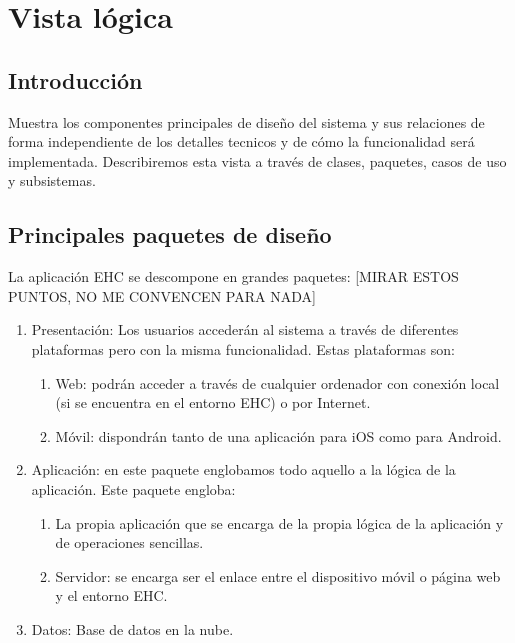 \chapter{Vista l\'ogica}
\section{Introducci\'on}
Muestra los componentes principales de dise\~no del sistema y sus relaciones de forma independiente de los detalles tecnicos y de c\'omo la funcionalidad ser\'a implementada. Describiremos esta vista a trav\'es de clases, paquetes, casos de uso y subsistemas.
\section{Principales paquetes de dise\~no}

La aplicaci\'on EHC se descompone en grandes paquetes: [MIRAR ESTOS PUNTOS, NO ME CONVENCEN PARA NADA]
\begin{enumerate}
\item Presentaci\'on: Los usuarios acceder\'an al sistema a trav\'es de diferentes plataformas pero con la misma funcionalidad. Estas plataformas son:
\begin{enumerate}
\item Web: podr\'an acceder a trav\'es de cualquier ordenador con conexi\'on local (si se encuentra en el entorno EHC) o por Internet.
\item M\'ovil: dispondr\'an tanto de una aplicaci\'on para iOS como para Android.
\end{enumerate}
\item Aplicaci\'on: en este paquete englobamos todo aquello a la l\'ogica de la aplicaci\'on. Este paquete engloba:
\begin{enumerate}
\item La propia aplicaci\'on que se encarga de la propia l\'ogica de la aplicaci\'on y de operaciones sencillas.
\item Servidor: se encarga ser el enlace entre el dispositivo m\'ovil o p\'agina web y el entorno EHC.
\end{enumerate}
\item Datos: Base de datos en la nube.
\end{enumerate}

